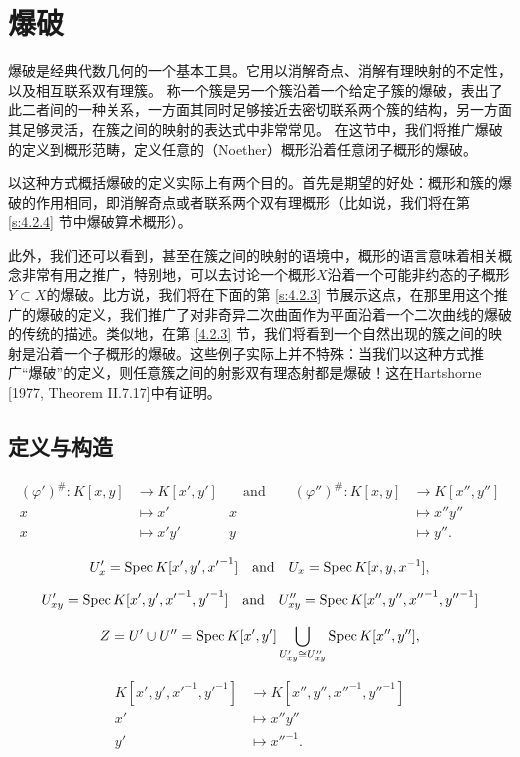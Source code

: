 \section{爆破}\label{s:4.2}

爆破是经典代数几何的一个基本工具。它用以消解奇点、消解有理映射的不定性，以及相互联系双有理簇。
称一个簇是另一个簇沿着一个给定子簇的爆破，表出了此二者间的一种关系，一方面其同时足够接近去密切联系两个簇的结构，另一方面其足够灵活，在簇之间的映射的表达式中非常常见。
在这节中，我们将推广爆破的定义到概形范畴，定义任意的（Noether）概形沿着任意闭子概形的爆破。

以这种方式概括爆破的定义实际上有两个目的。首先是期望的好处：概形和簇的爆破的作用相同，即消解奇点或者联系两个双有理概形（比如说，我们将在第 \ref{s:4.2.4} 节中爆破算术概形）。

此外，我们还可以看到，甚至在簇之间的映射的语境中，概形的语言意味着相关概念非常有用之推广，特别地，可以去讨论一个概形$X$沿着一个可能非约态的子概形$Y\subset X$的爆破。比方说，我们将在下面的第 \ref{s:4.2.3} 节展示这点，在那里用这个推广的爆破的定义，我们推广了对非奇异二次曲面作为平面沿着一个二次曲线的爆破的传统的描述。类似地，在第 \ref{4.2.3} 节，我们将看到一个自然出现的簇之间的映射是沿着一个子概形的爆破。这些例子实际上并不特殊：当我们以这种方式推广“爆破”的定义，则任意簇之间的射影双有理态射都是爆破！这在Hartshorne [1977, Theorem II.7.17]中有证明。

\subsection{定义与构造}\label{s:4.2.1}


\[
	\begin{aligned}
		(\varphi')^\#:K[x,y]&\longrightarrow K[x',y']&\quad \text{and}\qquad (\varphi'')^\#:K[x,y]&\longrightarrow K[x'',y'']\\
		x&\longmapsto x'& x&\longmapsto x''y''\\
		x&\longmapsto x'y'& y&\longmapsto y''.
	\end{aligned}
\]

\[
	U'_x=\operatorname{Spec} K[x',y',{x'}^{-1}]\quad \text{and}\quad 
	U_x=\operatorname{Spec} K[x,y,x^{-1}],
\]

\[
	U'_{xy}=\operatorname{Spec} K[x',y',{x'}^{-1},{y'}^{-1}]\quad \text{and}\quad 
	U''_{xy}=\operatorname{Spec} K[x'',y'',{x''}^{-1},{y''}^{-1}]
\]

\[
	Z=U'\cup U''=\operatorname{Spec} K[x',y']\bigcup_{U'_{xy}\cong U''_{xy}}\operatorname{Spec} K[x'',y''],
\]

\[
	\begin{aligned}
		K[x',y',{x'}^{-1},{y'}^{-1}]&\longrightarrow 
		K[x'',y'',{x''}^{-1},{y''}^{-1}]\\
		x'&\longmapsto x''y''\\
		y'&\longmapsto {x''}^{-1}.
	\end{aligned}
\]

